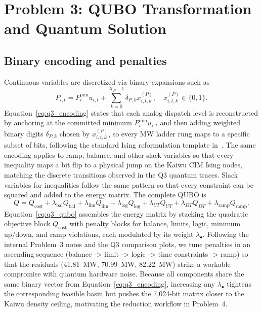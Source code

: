 \documentclass{apmcmthesis}
\begin{document}
\section{Problem 3: QUBO Transformation and Quantum Solution}

\subsection{Binary encoding and penalties}
Continuous variables are discretized via binary expansions such as
\begin{equation}
    \label{eq:q3_encoding}
    P_{i,t} = P_i^{\min} u_{i,t} + \sum_{k=0}^{K_P-1} \delta_{P,k} x^{(P)}_{i,t,k}, \quad x^{(P)}_{i,t,k}\in\{0,1\}.
\end{equation}
\noindent Equation~\eqref{eq:q3_encoding} states that each analog dispatch level is reconstructed by anchoring at the committed minimum $P_i^{\min} u_{i,t}$ and then adding weighted binary digits $\delta_{P,k}$ chosen by $x^{(P)}_{i,t,k}$, so every MW ladder rung maps to a specific subset of bits, following the standard Ising reformulation template in~\cite{lucas2014}.
The same encoding applies to ramp, balance, and other slack variables so that every inequality maps a bit flip to a physical jump on the Kaiwu CIM Ising nodes, matching the discrete transitions observed in the Q3 quantum traces.
Slack variables for inequalities follow the same pattern so that every constraint can be squared and added to the energy matrix. The complete QUBO is
\begin{equation}
    \label{eq:q3_qubo}
    Q = Q_{\text{cost}} + \lambda_{\text{bal}} Q_{\text{bal}} + \lambda_{\text{lim}} Q_{\text{lim}} + \lambda_{\text{log}} Q_{\text{log}} + \lambda_{UT} Q_{UT} + \lambda_{DT} Q_{DT} + \lambda_{\text{ramp}} Q_{\text{ramp}}.
\end{equation}
\noindent Equation~\eqref{eq:q3_qubo} assembles the energy matrix by stacking the quadratic objective block $Q_{\text{cost}}$ with penalty blocks for balance, limits, logic, minimum up/down, and ramp violations, each modulated by its weight $\lambda_{\bullet}$.
Following the internal Problem~3 notes and the Q3 comparison plots, we tune penalties in an ascending sequence (balance -> limit -> logic -> time constraints -> ramp) so that the residuals (41.81~MW, 70.99~MW, 82.22~MW) strike a workable compromise with quantum hardware noise.
Because all components share the same binary vector from Equation~\eqref{eq:q3_encoding}, increasing any $\lambda_{\bullet}$ tightens the corresponding feasible basin but pushes the 7,024-bit matrix closer to the Kaiwu density ceiling, motivating the reduction workflow in Problem~4.
\end{document}
